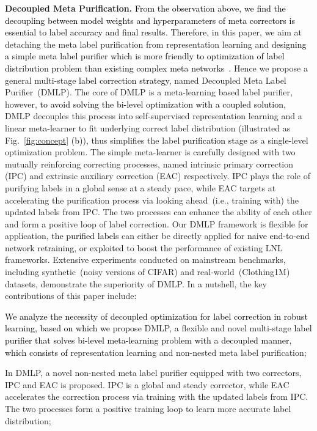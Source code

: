 \documentclass[10pt,twocolumn,letterpaper]{article}
\newcommand{\lyx}[1]{\textcolor{black}{#1}}
\newcommand{\leone}[1]{\textcolor{black}{#1}}
\newcommand{\zbsN}[1]{\textcolor{black}{#1}}
\begin{document}
{\textbf{Decoupled Meta Purification.}} \zbsN{From the observation above, } \lyx{we find the decoupling between model weights and hyperparameters of meta correctors is essential to label accuracy and final results. Therefore, }
in this paper, we {aim at detaching the meta label purification from representation learning and} \lyx{designing a simple meta label purifier which is more friendly to optimization of label distribution problem than existing complex meta networks~\cite{zheng2021meta, AAAI-2021-meta}.} Hence we propose a general multi-stage \lyx{label correction strategy}, named Decoupled Meta Label Purifier~(DMLP). {The core of DMLP is a meta-learning based label purifier, however,} \lyx{to avoid solving the bi-level optimization with a coupled solution}, DMLP decouples {this process into self-supervised} representation learning and {a linear meta-learner to fit underlying correct label distribution (illustrated as Fig.~\ref{fig:concept} \leone{(b)})}, thus simplifies the label \lyx{purification stage as} a single-level optimization problem. {The simple meta-learner is carefully designed with two mutually reinforcing correcting processes, named intrinsic primary correction (IPC) and extrinsic auxiliary correction (EAC) respectively. IPC plays the role of purifying labels in a global sense at a steady pace, while EAC targets at accelerating the purification process via looking ahead~(i.e., training with) the updated labels from IPC. The two processes can enhance the ability of each other and form a positive loop of label correction.}
{Our DMLP framework is flexible for application, \lyx{the purified labels} can either be directly applied for \lyx{naive end-to-end network retraining}, or \lyx{exploited} to boost the performance of existing LNL frameworks.} Extensive experiments conducted on mainstream benchmarks, including synthetic~(noisy versions of CIFAR) and real-world~(Clothing1M) datasets, demonstrate the superiority of {DMLP}. In a nutshell, the key contributions of this paper include:






 \lyx{We analyze the necessity of decoupled optimization for label correction in robust learning, based on which we propose }DMLP, a {flexible and} novel multi-stage \lyx{label purifier that solves bi-level meta-learning problem with a decoupled manner, which consists of} representation learning and {non-nested meta label purification; } 

 In DMLP, a novel non-nested meta label purifier equipped with two correctors, IPC and EAC is proposed. IPC is a global and steady corrector, while EAC accelerates the correction process via training with the updated labels from IPC. The two processes form a positive training loop {to learn more accurate label distribution};
\end{document}
